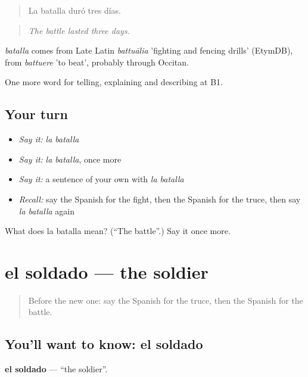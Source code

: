 \begin{quote}
La batalla duró tres días.
\end{quote}

\begin{quote}
\emph{The battle lasted three days.}
\end{quote}

\begin{cousinweb}
\emph{batalla} comes from Late Latin \emph{battuālia} 'fighting and fencing drills' (EtymDB), from \emph{battuere} 'to beat', probably through Occitan.
\end{cousinweb}

\begin{grammarlens}[title={What you've built}]
One more word for telling, explaining and describing at B1.
\end{grammarlens}

\subsection*{Your turn}
\begin{itemize}
\raggedright
  \item \emph{Say it:} \emph{la batalla}
  \item \emph{Say it:} \emph{la batalla}, once more
  \item \emph{Say it:} a sentence of your own with \emph{la batalla}
  \item \emph{Recall:} say the Spanish for the fight, then the Spanish for the truce, then say \emph{la batalla} again
\end{itemize}

\begin{tcolorbox}[breakable,colback=teal!4,colframe=teal!35!black,title={Before you move on}]
What does la batalla mean? (\textquotedblleft{}The battle\textquotedblright{}.) Say it once more.
\end{tcolorbox}
\section[el soldado]{el soldado — the soldier}

\label{lesson:ES-C567-soldado}



\begin{quote}
Before the new one: say the Spanish for the truce, then the Spanish for the battle.
\end{quote}

\subsection*{You'll want to know: el soldado}
\textbf{el soldado} — \textquotedblleft{}the soldier\textquotedblright{}.

